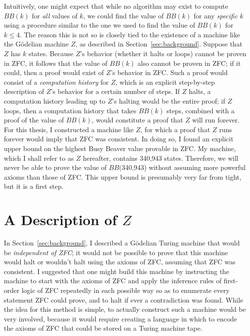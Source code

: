 \documentclass[11pt]{report}
\newcommand{\statenum}{340,943 }
\newcommand{\bbstatenum}{$BB($340,943) }
\begin{document}
Intuitively, one might expect that while no algorithm may exist to compute $BB(k)$ for \emph{all} values of $k$, we could find the value of $BB(k)$ for any \emph{specific} $k$ using a procedure similar to the one we used to find the value of $BB(k)$ for $k \le 4$. The reason this is not so is closely tied to the existence of a machine like the G\"{o}delian machine $Z$, as described in Section~\ref{sec:background}. Suppose that $Z$ has $k$ states. Because $Z$'s behavior (whether it halts or loops) cannot be proven in ZFC, it follows that the value of $BB(k)$ also cannot be proven in ZFC; if it could, then a proof would exist of $Z$'s behavior in ZFC. Such a proof would consist of a \emph{computation history} for $Z$, which is an explicit step-by-step description of $Z$'s behavior for a certain number of steps. If $Z$ halts, a computation history leading up to $Z$'s halting would be the entire proof; if $Z$ loops, then a computation history that takes $BB(k)$ steps, combined with a proof of the value of $BB(k)$, would constitute a proof that $Z$ will run forever. \\

For this thesis, I constructed a machine like $Z$, for which a proof that $Z$ runs forever would imply that ZFC was consistent. In doing so, I found an explicit upper bound on the highest Busy Beaver value provable in ZFC. My machine, which I shall refer to as $Z$ hereafter, contains \statenum states. Therefore, we will never be able to prove the value of \bbstatenum without assuming more powerful axioms than those of ZFC. This upper bound is presumably very far from tight, but it is a first step.

\section{A Description of $Z$}

In Section~\ref{sec:background}, I described a G\"{o}delian Turing machine that would be \emph{independent of ZFC}; it would not be possible to prove that this machine would halt or wouldn't halt using the axioms of ZFC, assuming that ZFC was consistent. I suggested that one might build this machine by instructing the machine to start with the axioms of ZFC and apply the inference rules of first-order logic of ZFC repeatedly in each possible way so as to enumerate every statement ZFC could prove, and to halt if ever a contradiction was found. While the idea for this method is simple, to actually construct such a machine would be very involved, because it would require creating a language in which to encode the axioms of ZFC that could be stored on a Turing machine tape. \\
\end{document}
